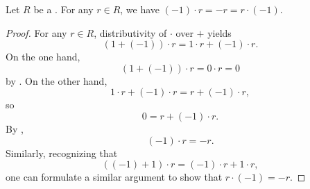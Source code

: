 \begin{lemma} \label{lemma:multiplication_by_minus_one_in_a_ring_is_additive_inverse}
    Let $R$ be a . For any $r \in R$, we have $(-1) \cdot r = -r = r \cdot (-1)$.
\end{lemma}
\begin{proof}
    For any $r \in R$, distributivity of $\cdot$ over $+$ yields
    $$(1 + (-1)) \cdot r = 1 \cdot r + (-1) \cdot r.$$
    On the one hand,
    $$(1 + (-1)) \cdot r = 0 \cdot r = 0$$
    by . 
    On the other hand,
    $$1 \cdot r + (-1) \cdot r = r + (-1) \cdot r,$$
    so 
    $$ 0 = r+ (-1) \cdot r.$$
    By , 
    $$(-1) \cdot r = -r.$$
    Similarly, recognizing that 
    $$((-1) + 1) \cdot r = (-1) \cdot r + 1 \cdot r,$$
    one can formulate a similar argument to show that $r \cdot (-1) = -r$. 
\end{proof}